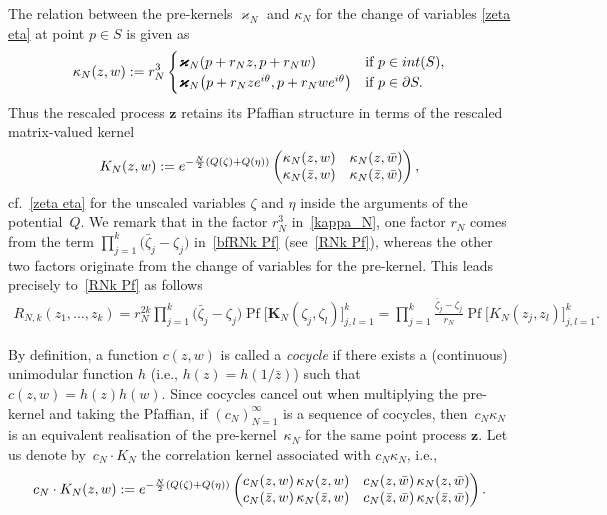 \documentclass[11pt]{article}
\numberwithin{equation}{section}
\numberwithin{equation}{section}
\newcommand{\bfK}{{\mathbf K}}
\newcommand{\bfkappa}{{\bm \varkappa}}
\newcommand{\1}{\chi}
\newcommand{\Pf}{{\operatorname{Pf}}}
\begin{document}
The relation between the pre-kernels $\bfkappa_N$ and $\kappa_N$
for the change of variables \eqref{zeta eta}
at point $p\in S$ is given as
\begin{gather} \label{kappa_N}
	\kappa_N(z,w):=r_N^3
	\begin{cases}
		\bfkappa_N( p+r_Nz, p+r_Nw) &\text{if } p \in \textup{int}(S),
		\\
	\bfkappa_N\big( p+r_Nz {\rm e}^{{\rm i}\theta}, p+r_Nw {\rm e}^{{\rm i}\theta} \big)&\text{if } p \in \partial S.
	\end{cases} 	
\end{gather}
Thus the rescaled process $\boldsymbol{z}$ retains its Pfaffian structure in terms of the rescaled matrix-valued kernel
\begin{gather} \label{K_N}
	K_N(z,w):={\rm e}^{ -\frac{N}{2} (Q( \zeta )+Q( \eta )) } \begin{pmatrix}
		\kappa_N(z,w) & \kappa_N(z,\bar{w}) \\
		\kappa_N(\bar{z},w) & \kappa_N(\bar{z},\bar{w})
	\end{pmatrix},
\end{gather}
cf.~\eqref{zeta eta} for the unscaled variables $\zeta$ and $\eta$ inside the arguments of the potential~$Q$. We remark that in the factor $r_N^3$ in~\eqref{kappa_N}, one factor $r_N$ comes from the term $\prod_{j=1}^k \big(\bar{\zeta}_j-\zeta_j\big)$ in~\eqref{bfRNk Pf} (see~\eqref{RNk Pf}), whereas the other two factors originate from the change of variables for the pre-kernel. This leads precisely to~\eqref{RNk Pf} as follows
	\begin{gather*}
		 R_{N,k}(z_1,\dots, z_k)
		 = 	r_N^{2k} \prod_{j=1}^{k} \big(\bar{\zeta}_j-\zeta_j\big) \Pf \big[ \bfK_{N}(\zeta_j,\zeta_l) \big]_{ j,l=1 }^k
		= \prod_{j=1}^{k} \frac{\bar{\zeta}_j-\zeta_j}{r_N} \Pf \big[ K_{N}(z_j,z_l) \big]_{ j,l=1 }^k.
	\end{gather*}


By definition, a function $c(z,w)$ is called a \textit{cocycle} if there exists a (continuous) unimodular function $h$ (i.e., $h(z)=h(1/\bar{z})$) such that $c(z,w) = h(z)h(w).$ Since cocycles cancel out when multiplying the pre-kernel and taking the Pfaffian, if $(c_N)_{N=1}^\infty$ is a sequence of cocycles, then~$c_N\kappa_N$ is an equivalent realisation of the pre-kernel~$\kappa_N$
for the same point process $\boldsymbol{z}$. Let us denote by~$c_N \cdot K_N$ the correlation kernel associated with $c_N \kappa_N$, i.e.,
\begin{gather*}
c_N \cdot K_N(z,w):= {\rm e}^{ -\frac{N}{2} (Q( \zeta )+Q( \eta )) } \begin{pmatrix}
	 c_N(z,w)\, \kappa_N(z,w) & c_N(z,\bar{w})\, \kappa_N(z,\bar{w}) \\
	c_N(\bar{z},w)\, \kappa_N(\bar{z},w) & c_N(\bar{z},\bar{w}) \, \kappa_N(\bar{z},\bar{w})
	\end{pmatrix}.
\end{gather*}
\end{document}
